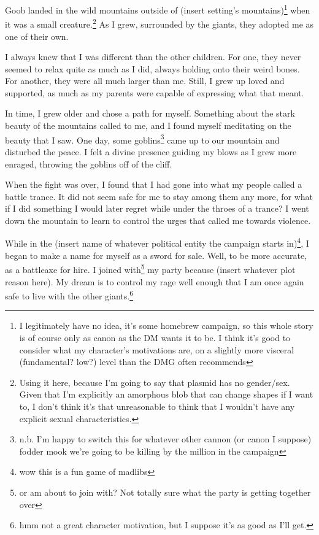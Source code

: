 \documentclass[12pt]{article}[titlepage]
\renewcommand{\,}{\textsuperscript{,}}
\begin{document}
Goob landed in the wild mountains outside of (insert setting's mountains)\footnote{I legitimately have no idea, it's some homebrew campaign, so this whole story is of course only as canon as the DM wants it to be.
I think it's good to consider what my character's motivations are, on a slightly more visceral (fundamental? low?) level than the DMG often recommends}
when it was a small creature.\footnote{Using it here, because I'm going to say that plasmid has no gender/sex.
Given that I'm explicitly an amorphous blob that can change shapes if I want to, I don't think it's that unreasonable to think that I wouldn't have any explicit sexual characteristics.}
As I grew, surrounded by the giants, they adopted me as one of their own.

I always knew that I was different than the other children.
For one, they never seemed to relax quite as much as I did, always holding onto their weird bones.
For another, they were all much larger than me.
Still, I grew up loved and supported, as much as my parents were capable of expressing what that meant.

In time, I grew older and chose a path for myself.
Something about the stark beauty of the mountains called to me, and I found myself meditating on the beauty that I saw.
One day, some goblins\footnote{n.b. I'm happy to switch this for whatever other cannon (or canon I suppose) fodder mook we're going to be killing by the million in the campaign} came up to our mountain and disturbed the peace.
I felt a divine presence guiding my blows as I grew more enraged, throwing the goblins off of the cliff.

When the fight was over, I found that I had gone into what my people called a battle trance.
It did not seem safe for me to stay among them any more, for what if I did something I would later regret while under the throes of a trance?
I went down the mountain to learn to control the urges that called me towards violence.

While in the (insert name of whatever political entity the campaign starts in)\footnote{wow this is a fun game of madlibs}, I began to make a name for myself as a sword for sale.
Well, to be more accurate, as a battleaxe for hire.
I joined with\footnote{or am about to join with? Not totally sure what the party is getting together over} my party because (insert whatever plot reason here).
My dream is to control my rage well enough that I am once again safe to live with the other giants.\footnote{hmm not a great character motivation, but I suppose it's as good as I'll get.}
\end{document}
